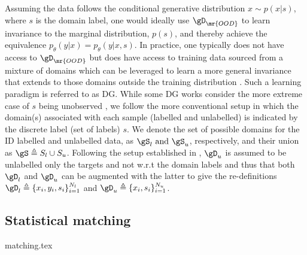 Assuming the data follows the conditional generative distribution \( x \sim p(x | s) \), where
\(s\) is the domain label, one would ideally use \( \gD_{\mr{OOD}} \) to learn invariance to the
marginal distribution, \( p(s) \), and thereby achieve the equivalence \( p_\theta(y | x) =
p_\theta(y | x,
s) \).
%
In practice, one typically does not have access to \( \gD_{\mr{OOD}} \) but does have access to
training data sourced from a mixture of domains which can be leveraged to learn a more general
invariance that extends to those domains outside the training distribution
\cite{arjovsky2019invariant}.
%
Such a learning paradigm is referred to as \acf{DG}.
%
While some \ac{DG} works consider the more extreme case of $s$ being unobserved
\citep{creager2021environment}, we follow the more conventional setup \citep{arjovsky2019invariant,
krueger2021out, SagWeiLeeGaoetal22} in which the domain(s) associated with each sample (labelled
and unlabelled) is indicated by the discrete label (set of labels) $s$. 
%
We denote the set of possible domains for the \ac{ID} labelled and unlabelled data, as \( \gS_l$
and $\gS_u \), respectively, and their union as \( \gS \triangleq S_l \cup S_u \).
%
Following the setup established in \cite{SagWeiLeeGaoetal22}, \( \gD_u \) is assumed to be
unlabelled only \wrt{} the targets and not w.r.t the domain labels and thus that both \( \gD_l \)
and \( \gD_u \) can be augmented with the latter to give the re-definitions \( \gD_l \triangleq \{
  x_i, y_i, s_i \}_{i=1}^{N_l} \) and \( \gD_u \triangleq \{x_i, s_i \}_{i=1}^{N_u} \).

\subsection{Statistical matching} 
{matching.tex}
